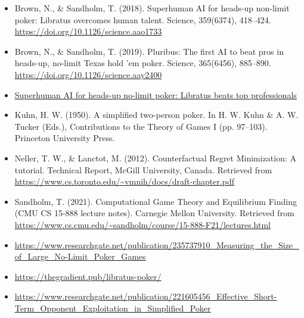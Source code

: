 \documentclass[
]{article}
\begin{document}
\begin{itemize}
\item
  Brown, N., \& Sandholm, T. (2018). Superhuman AI for heads-up
  non-limit poker: Libratus overcomes human talent. Science, 359(6374),
  418--424.
  \href{https://doi.org/10.1126/science.aao1733}{\ul{https://doi.org/10.1126/science.aao1733}}
\item
  Brown, N., \& Sandholm, T. (2019). Pluribus: The first AI to beat pros
  in heads-up, no-limit Texas hold 'em poker. Science, 365(6456),
  885--890.
  \href{https://doi.org/10.1126/science.aay2400}{\ul{https://doi.org/10.1126/science.aay2400}}
\item
  \href{https://www.youtube.com/watch?v=2dX0lwaQRX0&ab_channel=NoamBrown}{\ul{Superhuman
  AI for heads-up no-limit poker: Libratus beats top professionals}}
\item
  Kuhn, H. W. (1950). A simplified two-person poker. In H. W. Kuhn \& A.
  W. Tucker (Eds.), Contributions to the Theory of Games I (pp.
  97--103). Princeton University Press.
\item
  Neller, T. W., \& Lanctot, M. (2012). Counterfactual Regret
  Minimization: A tutorial. Technical Report, McGill University, Canada.
  Retrieved from
  \href{https://www.cs.toronto.edu/~vmnih/docs/draft-chapter.pdf}{\ul{https://www.cs.toronto.edu/\textasciitilde vmnih/docs/draft-chapter.pdf}}
\item
  Sandholm, T. (2021). Computational Game Theory and Equilibrium Finding
  (CMU CS 15-888 lecture notes). Carnegie Mellon University. Retrieved
  from
  \href{https://www.cs.cmu.edu/~sandholm/course/15-888-F21/lectures.html}{\ul{https://www.cs.cmu.edu/\textasciitilde sandholm/course/15-888-F21/lectures.html}}
\item
  \href{https://www.researchgate.net/publication/235737910_Measuring_the_Size_of_Large_No-Limit_Poker_Games}{\ul{https://www.researchgate.net/publication/235737910\_Measuring\_the\_Size\_of\_Large\_No-Limit\_Poker\_Games}}
\item
  \href{https://thegradient.pub/libratus-poker/}{\ul{https://thegradient.pub/libratus-poker/}}
\item
  \href{https://www.researchgate.net/publication/221605456_Effective_Short-Term_Opponent_Exploitation_in_Simplified_Poker}{\ul{https://www.researchgate.net/publication/221605456\_Effective\_Short-Term\_Opponent\_Exploitation\_in\_Simplified\_Poker}}
\end{itemize}
\end{document}
